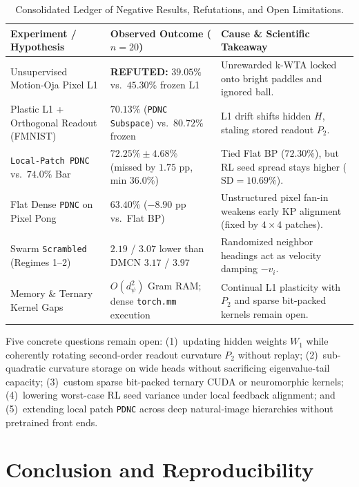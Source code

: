 \documentclass[11pt,a4paper]{article}
\begin{document}
\begin{table}[htbp]
\centering
\caption{Consolidated Ledger of Negative Results, Refutations, and Open Limitations.}
\label{tab:failures}
\footnotesize
\begin{tabular}{@{}p{4.0cm}p{4.4cm}p{5.8cm}@{}}
\toprule
\textbf{Experiment / Hypothesis} & \textbf{Observed Outcome ($n=20$)} & \textbf{Cause \& Scientific Takeaway} \\
\midrule
Unsupervised Motion-Oja Pixel L1 & \textbf{REFUTED:} $39.05\%$ vs.\ $45.30\%$ frozen L1 & Unrewarded k-WTA locked onto bright paddles and ignored ball. \\
Plastic L1 + Orthogonal Readout (FMNIST) & $70.13\%$ (\texttt{PDNC Subspace}) vs.\ $80.72\%$ frozen & L1 drift shifts hidden $H$, staling stored readout $P_2$. \\
\texttt{Local-Patch PDNC} vs.\ $74.0\%$ Bar & $72.25\% \pm 4.68\%$ (missed by $1.75\text{ pp}$, min $36.0\%$) & Tied Flat BP ($72.30\%$), but RL seed spread stays higher ($\text{SD}=10.69\%$). \\
Flat Dense \texttt{PDNC} on Pixel Pong & $63.40\%$ ($-8.90\text{ pp}$ vs.\ Flat BP) & Unstructured pixel fan-in weakens early KP alignment (fixed by $4\times 4$ patches). \\
Swarm \texttt{Scrambled} (Regimes 1--2) & $2.19$ / $3.07$ lower than DMCN $3.17$ / $3.97$ & Randomized neighbor headings act as velocity damping $-v_i$. \\
Memory \& Ternary Kernel Gaps & $O(d_\psi^2)$ Gram RAM; dense \texttt{torch.mm} execution & Continual L1 plasticity with $P_2$ and sparse bit-packed kernels remain open. \\
\bottomrule
\end{tabular}
\end{table}

Five concrete questions remain open: (1)~updating hidden weights $W_1$ while coherently rotating second-order readout curvature $P_2$ without replay; (2)~sub-quadratic curvature storage on wide heads without sacrificing eigenvalue-tail capacity; (3)~custom sparse bit-packed ternary CUDA or neuromorphic kernels; (4)~lowering worst-case RL seed variance under local feedback alignment; and (5)~extending local patch \texttt{PDNC} across deep natural-image hierarchies without pretrained front ends.

\section{Conclusion and Reproducibility}
\end{document}

